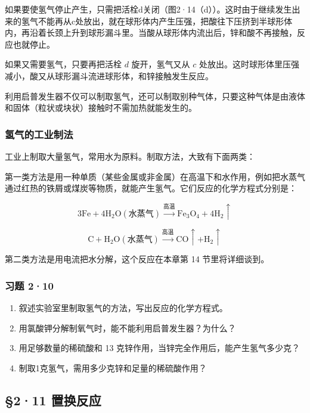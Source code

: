 如果要使氢气停止产生，只需把活栓d关闭（图2·14（d））。这时由于继续发生出来的氢气不能再从c处放出，就在球形体内产生压强，把酸往下压挤到半球形体内，再沿着长颈上升到球形漏斗里。当酸从球形体内流出后，锌和酸不再接触，反应也就停止。

如果又需要氢气，只要再把活栓 \(d\) 旋开，氢气又从 \(c\)
处放出。这时球形体里压强减小，酸又从球形漏斗流进球形体，和锌接触发生反应。

利用启普发生器不仅可以制取氢气，还可以制取别种气体，只要这种气体是由液体和固体（粒状或块状）接触时不需加热就能发生的。

\subsubsection{氢气的工业制法}

工业上制取大量氢气，常用水为原料。制取方法，大致有下面两类：

第一类方法是用一种单质（某些金属或非金属）在高温下和水作用，例如把水蒸气通过红热的铁屑或煤炭等物质，就能产生氢气。它们反应的化学方程式分别是：

\[
3 \mathrm{Fe} + 4 \mathrm{H}_{2} \mathrm{O} (\text{水蒸气}) \xrightarrow {\text{高温}} \mathrm{Fe}_{3} \mathrm{O}_{4} + 4 \mathrm{H}_{2} \uparrow
\]

\[
\mathrm{C} + \mathrm{H}_{2} \mathrm{O} (\text{水蒸气}) \xrightarrow {\text{高温}} \mathrm{CO} \uparrow + \mathrm{H}_{2} \uparrow
\]

第二类方法是用电流把水分解，这个反应在本章第 14 节里将详细谈到。

\subsubsection{习题 2·10}

\begin{enumerate}
\item
  叙述实验室里制取氢气的方法，写出反应的化学方程式。
\item
  用氯酸钾分解制氧气时，能不能利用启普发生器？为什么？
\item
  用足够数量的稀硫酸和 13 克锌作用，当锌完全作用后，能产生氢气多少克？
\item
  制取1克氢气，需用多少克锌和足量的稀硫酸作用？
\end{enumerate}

\subsection{§2·11 置换反应}

